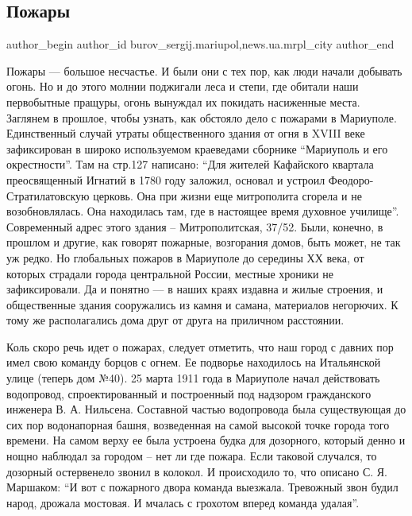  
 
 
 
 
 
\subsection{Пожары}
\label{sec:28_01_2017.stz.news.ua.mrpl_city.1.pozhary}
 
\ifcmt
 author_begin
   author_id burov_sergij.mariupol,news.ua.mrpl_city
 author_end
\fi


Пожары — большое несчастье. И были они с тех пор, как люди начали добывать
огонь. Но и до этого молнии поджигали леса и степи, где обитали наши
первобытные пращуры, огонь вынуждал их покидать насиженные места. Заглянем в
прошлое, чтобы узнать, как обстояло дело с пожарами в Мариуполе. Единственный
случай  утраты общественного здания от огня в XVIII веке зафиксирован в широко
используемом краеведами сборнике \enquote{Мариуполь и его окрестности}. Там на стр.127
написано: \enquote{Для жителей Кафайского квартала преосвященный Игнатий в 1780 году
заложил, основал и устроил Феодоро-Стратилатовскую церковь. Она при жизни еще
митрополита сгорела и не возобновлялась. Она находилась там, где в настоящее
время духовное училище}. Современный адрес этого здания – Митрополитская,
37/52.  Были, конечно, в прошлом и другие, как говорят пожарные, возгорания
домов, быть может, не так уж редко. Но глобальных пожаров в Мариуполе до
середины ХХ века, от которых страдали города центральной России, местные
хроники  не зафиксировали. Да и понятно — в наших краях издавна и жилые
строения, и общественные здания сооружались из камня и самана, материалов
негорючих. К тому же располагались дома друг от друга на приличном расстоянии.


Коль скоро речь идет о пожарах, следует отметить, что наш город с давних пор
имел свою команду борцов с огнем. Ее подворье находилось на Итальянской улице
(теперь дом №40). 25 марта 1911 года в Мариуполе начал действовать водопровод,
спроектированный и построенный под надзором гражданского инженера В. А.
Нильсена. Составной частью водопровода была существующая до сих пор
водонапорная башня, возведенная на самой высокой точке города того времени.  На
самом верху ее была устроена будка для дозорного, который денно и нощно
наблюдал за городом – нет ли где пожара. Если таковой случался, то дозорный
остервенело звонил в колокол. И происходило то, что описано С. Я. Маршаком: \enquote{И
вот с пожарного двора команда выезжала. Тревожный звон будил народ, дрожала
мостовая. И мчалась с грохотом вперед команда удалая}. 

